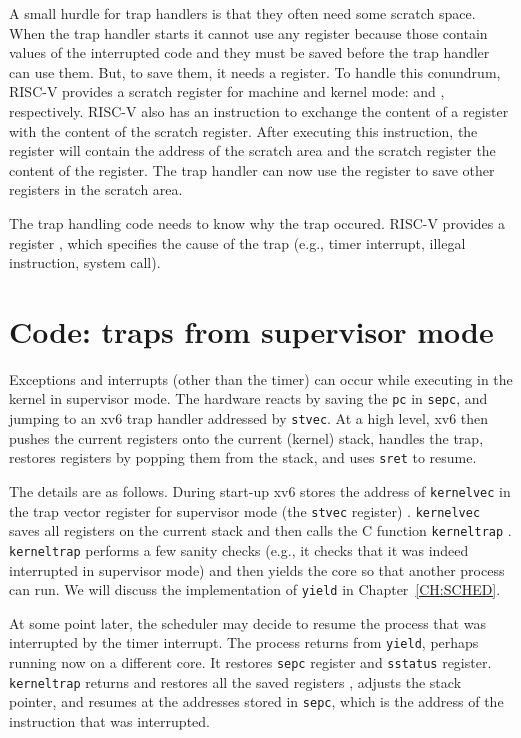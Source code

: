 A small hurdle for trap handlers is that they often
need some scratch space. When the trap handler starts it cannot
use any register because those contain values of the interrupted code
and they must be saved before the trap handler can use them. But,
to save them, it needs a register.  To handle this conundrum,
RISC-V provides a scratch register for machine and kernel
mode:  and , respectively.
RISC-V also has an instruction to exchange the content
of a register with the content of the scratch register. After
executing this instruction, the register will contain the address of
the scratch area and the scratch register the content of the
register. The trap handler can now use the register to save other
registers in the scratch area.

The trap handling code needs to know why the trap occured.
RISC-V provides a register
, which specifies the cause of the trap (e.g.,
timer interrupt, illegal instruction, system call).

\section{Code: traps from supervisor mode}

Exceptions and interrupts (other than the timer) can occur while
executing in the kernel in supervisor mode. The hardware reacts by
saving the {\tt pc} in {\tt sepc}, and jumping to an xv6 trap handler
addressed by {\tt stvec}. At a high level, xv6 then pushes the current
registers onto the current (kernel) stack, handles the trap, restores
registers by popping them from the stack, and uses {\tt sret} to resume.

The details are as follows. During start-up xv6 stores the address of
\lstinline{kernelvec} in the trap vector register for supervisor mode
(the \lstinline{stvec} register)
.  \lstinline{kernelvec} saves
all registers on the current stack
and then calls the C function \lstinline{kerneltrap}
.  \lstinline{kerneltrap}
 performs a few sanity checks
(e.g., it checks that it was indeed interrupted in supervisor mode) and
then yields the core so that another process can run.  We will discuss
the implementation of \lstinline{yield} in Chapter~\ref{CH:SCHED}.

At some point later, the scheduler may decide to resume the process
that was interrupted by the timer interrupt. The process returns from
\lstinline{yield}, perhaps running now on a different core.  It
restores \lstinline{sepc} register and \lstinline{sstatus} register.
\lstinline{kerneltrap} returns and restores all the saved registers
, adjusts the stack
pointer, and resumes at the addresses stored in \lstinline{sepc},
which is the address of the instruction that was interrupted.


